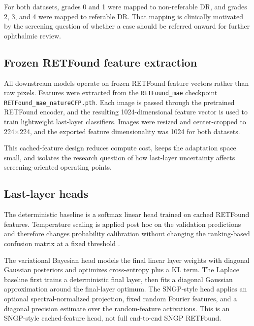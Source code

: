 \documentclass[11pt]{article}
\begin{document}


For both datasets, grades 0 and 1 were mapped to non-referable DR, and grades 2, 3, and 4 were mapped to referable DR. That mapping is clinically motivated by the screening question of whether a case should be referred onward for further ophthalmic review.

\subsection{Frozen RETFound feature extraction}
All downstream models operate on frozen RETFound feature vectors rather than raw pixels. Features were extracted from the \texttt{RETFound\_mae} checkpoint \texttt{RETFound\_mae\_natureCFP.pth}. Each image is passed through the pretrained RETFound encoder, and the resulting 1024-dimensional feature vector is used to train lightweight last-layer classifiers. Images were resized and center-cropped to 224$\times$224, and the exported feature dimensionality was 1024 for both datasets.



This cached-feature design reduces compute cost, keeps the adaptation space small, and isolates the research question of how last-layer uncertainty affects screening-oriented operating points.

\subsection{Last-layer heads}
The deterministic baseline is a softmax linear head trained on cached RETFound features. Temperature scaling is applied post hoc on the validation predictions and therefore changes probability calibration without changing the ranking-based confusion matrix at a fixed threshold \citep{guo2017calibration}.

The variational Bayesian head models the final linear layer weights with diagonal Gaussian posteriors and optimizes cross-entropy plus a KL term. The Laplace baseline first trains a deterministic final layer, then fits a diagonal Gaussian approximation around the final-layer optimum. The SNGP-style head applies an optional spectral-normalized projection, fixed random Fourier features, and a diagonal precision estimate over the random-feature activations. This is an SNGP-style cached-feature head, not full end-to-end SNGP RETFound.
\end{document}
